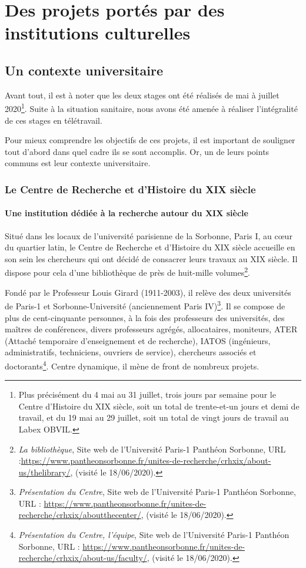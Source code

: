 \part{Des projets portés par des institutions culturelles}

 
\chapter{Un contexte universitaire}


Avant tout, il est à noter que les deux stages ont été réalisés de mai à juillet 2020\footnote{Plus précisément du 4 mai au 31 juillet, trois jours par semaine pour le Centre d'Histoire du XIX siècle, soit un total de trente-et-un jours et demi de travail, et du 19 mai au 29 juillet, soit un total de vingt jours de travail au Labex OBVIL.}. Suite à la situation sanitaire, nous avons été amenée à réaliser l'intégralité de ces stages en télétravail.

Pour mieux comprendre les objectifs de ces projets, il est important de souligner tout d'abord dans quel cadre ils se sont accomplis. Or, un de leurs points communs est leur contexte universitaire. 


\section{Le Centre de Recherche et d'Histoire du XIX siècle}

\subsection{Une institution dédiée à la recherche autour du XIX siècle}

Situé dans les locaux de l'université parisienne de la Sorbonne, Paris I, au c\oe ur  du quartier latin, le Centre de Recherche et d'Histoire du XIX siècle accueille en son sein les chercheurs qui ont décidé de consacrer leurs travaux au XIX siècle. 
Il dispose pour cela d'une bibliothèque de près de huit-mille volumes\footnote{\emph{La bibliothèque}, Site web de l’Université Paris-1 Panthéon Sorbonne, URL :\url{https://www.pantheonsorbonne.fr/unites-de-recherche/crhxix/about-us/thelibrary/}, (visité le 18/06/2020). }.


Fondé par le Professeur Louis Girard (1911-2003), il relève des deux universités de Paris-1 et Sorbonne-Université (anciennement Paris IV)\footnote{\emph{Présentation du Centre}, Site web de l’Université Paris-1 Panthéon Sorbonne, URL : \url{https://www.pantheonsorbonne.fr/unites-de-recherche/crhxix/aboutthecenter/}, (visité le 18/06/2020).}. Il se compose de plus de cent-cinquante personnes, à la fois des professeurs des universités, des maîtres de conférences, divers professeurs agrégés,  allocataires, moniteurs, ATER (Attaché temporaire d’enseignement et de recherche), IATOS (ingénieurs, administratifs, techniciens, ouvriers de service), chercheurs associés et doctorants\footnote{\emph{Présentation du Centre, l’équipe}, Site web de l’Université Paris-1 Panthéon Sorbonne, URL : \url{https://www.pantheonsorbonne.fr/unites-de-recherche/crhxix/about-us/faculty/}, (visité le 18/06/2020).}.
Centre dynamique, il mène de front de nombreux projets.

